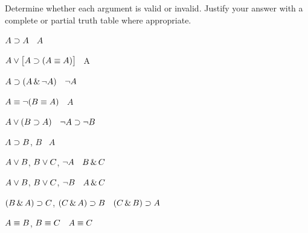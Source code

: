 \solutions
\problempart
\label{pr.TT.valid}
Determine whether each argument is valid or invalid. Justify your answer with a complete or partial truth table where appropriate.
\begin{earg}
\item $A\supset A$ \therefore\ $A$ %
\item $A\vee\bigl[A\supset(A\equiv A)\bigr]$ \therefore\ A %
\item $A\supset(A\,\&\,\neg A)$ \therefore\ $\neg A$ %
\item $A\equiv\neg(B\equiv A)$ \therefore\ $A$ %
\item $A\vee(B\supset A)$ \therefore\ $\neg A \supset \neg B$ %
\item $A\supset B$, $B$ \therefore\ $A$ %
\item $A\vee B$, $B\vee C$, $\neg A$ \therefore\ $B \,\&\, C$ %
\item $A\vee B$, $B\vee C$, $\neg B$ \therefore\ $A \,\&\, C$ %
\item $(B\,\&\, A)\supset C$, $(C\,\&\, A)\supset B$ \therefore\ $(C\,\&\, B)\supset A$ %
\item $A\equiv B$, $B\equiv C$ \therefore\ $A\equiv C$ %
\end{earg}

